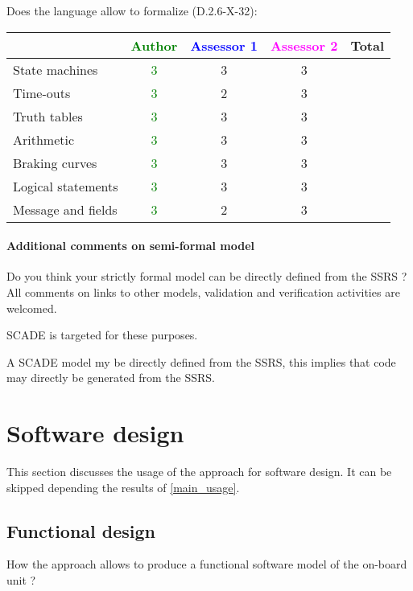 Does the language allow to  formalize (D.2.6-X-32):

\begin{tabular}{|l | c | c | c | c|}
\hline
& \textcolor{green}{Author} & \textcolor{blue}{Assessor 1} & \textcolor{magenta}{Assessor 2} & Total \\
\hline 
State machines  & \textcolor{green}{3} & 3 &3 &  \\
\hline
Time-outs  & \textcolor{green}{3} & 2 &3 &  \\
\hline
Truth tables  & \textcolor{green}{3} & 3 &3 &  \\
\hline
Arithmetic  & \textcolor{green}{3}& 3 &3 &  \\
\hline
Braking curves  & \textcolor{green}{3}& 3 &3 &  \\
\hline
Logical statements & \textcolor{green}{3}& 3 &3 &  \\
\hline
Message and fields &\textcolor{green}{3} & 2 &3 &  \\
\hline
\end{tabular}

\paragraph{Additional comments on semi-formal  model} Do you think your strictly formal  model can be directly defined from the SSRS ?
All comments on links to  other models, validation and verification activities are welcomed.

\begin{author_comment}
SCADE is targeted for these purposes.   
\end{author_comment}
\begin{assessor2}
A SCADE model my be directly defined from the SSRS, this implies that
code may directly be generated from the SSRS.
\end{assessor2}


\section{Software design}
This section discusses the usage of the approach for software design.
It can be skipped depending the results of \ref{main_usage}.

\subsection{Functional design}

How the approach allows to  produce a functional software model of the on-board unit ?

